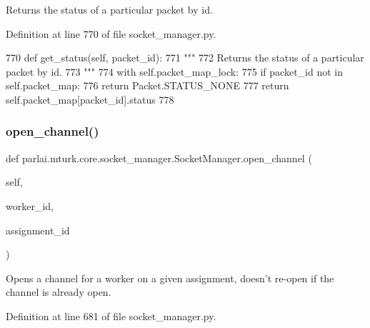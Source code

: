 \begin{DoxyVerb}Returns the status of a particular packet by id.
\end{DoxyVerb}
 

Definition at line 770 of file socket\+\_\+manager.\+py.


\begin{DoxyCode}
770     \textcolor{keyword}{def }get\_status(self, packet\_id):
771         \textcolor{stringliteral}{"""}
772 \textcolor{stringliteral}{        Returns the status of a particular packet by id.}
773 \textcolor{stringliteral}{        """}
774         with self.packet\_map\_lock:
775             \textcolor{keywordflow}{if} packet\_id \textcolor{keywordflow}{not} \textcolor{keywordflow}{in} self.packet\_map:
776                 \textcolor{keywordflow}{return} Packet.STATUS\_NONE
777             \textcolor{keywordflow}{return} self.packet\_map[packet\_id].status
778 
\end{DoxyCode}
\mbox{\label{classparlai_1_1mturk_1_1core_1_1socket__manager_1_1SocketManager_aa970567ac565617328cd1a07548b1427}} 
\subsubsection{\texorpdfstring{open\+\_\+channel()}{open\_channel()}}
{\footnotesize\ttfamily def parlai.\+mturk.\+core.\+socket\+\_\+manager.\+Socket\+Manager.\+open\+\_\+channel (\begin{DoxyParamCaption}\item[{}]{self,  }\item[{}]{worker\+\_\+id,  }\item[{}]{assignment\+\_\+id }\end{DoxyParamCaption})}

\begin{DoxyVerb}Opens a channel for a worker on a given assignment, doesn't re-open if the
channel is already open.
\end{DoxyVerb}
 

Definition at line 681 of file socket\+\_\+manager.\+py.


